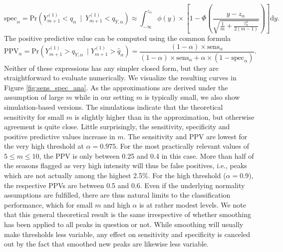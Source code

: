 \documentclass{article}
\begin{document}
\begin{equation}
\text{spec}_\alpha = \text{Pr}(Y_{m + 1}^{(1)} < \hat{q}_\alpha \ \mid \ Y_{m + 1}^{(1)} < q_{Y, \alpha}) \approx \int_{-\infty}^{z_\alpha}\phi(y) \times \left[1 - \Phi\left(\frac{y - z_\alpha}{\sqrt{\frac{1}{m} + \frac{z_\alpha^2}{2(m - 1)}}}\right)\right] \text{d}y.
\label{eq:spec}
\end{equation}
The positive predictive value can be computed using the common formula
\begin{equation}
\text{PPV}_\alpha = \text{Pr}(Y_{m + 1}^{(1)} > q_{Y, \alpha} \ \mid Y_{m + 1}^{(1)} > \hat{q}_\alpha) = \frac{(1 - \alpha) \times \text{sens}_\alpha}{(1 - \alpha) \times \text{sens}_\alpha + \alpha \times (1 - \text{spec}_\alpha)}.
\label{eq:ppv}
\end{equation}
Neither of these expressions has any simpler closed form, but they are straightforward to evaluate numerically. We visualize the resulting curves in Figure \ref{fig:sens_spec_ana}. As the approximations are derived under the assumption of large $m$ while in our setting $m$ is typically small, we also show simulation-based versions. The simulations indicate that the theoretical sensitivity for small $m$ is slightly higher than in the approximation, but otherwise agreement is quite close. Little surprisingly, the sensitivity, specificity and positive predictive values increase in $m$. The sensitivity and PPV are lowest for the very high threshold at $\alpha = 0.975$. For the most practically relevant values of $5 \leq m \leq 10$, the PPV is only between 0.25 and 0.4 in this case. More than half of the seasons flagged as very high intensity will thus be false positives, i.e., peaks which are not actually among the highest 2.5\%. For the high threshold ($\alpha = 0.9$), the respective PPVs are between 0.5 and 0.6. Even if the underlying normality assumptions are fulfilled, there are thus natural limits to the classification performance, which for small $m$ and high $\alpha$ is at rather modest levels. We note that this general theoretical result is the same irrespective of
 whether smoothing has been applied to all peaks in question or not. While smoothing will usually make thresholds less variable, any effect on sensitivity and specificity is canceled out by the fact that smoothed new peaks are likewise less variable.
\end{document}
